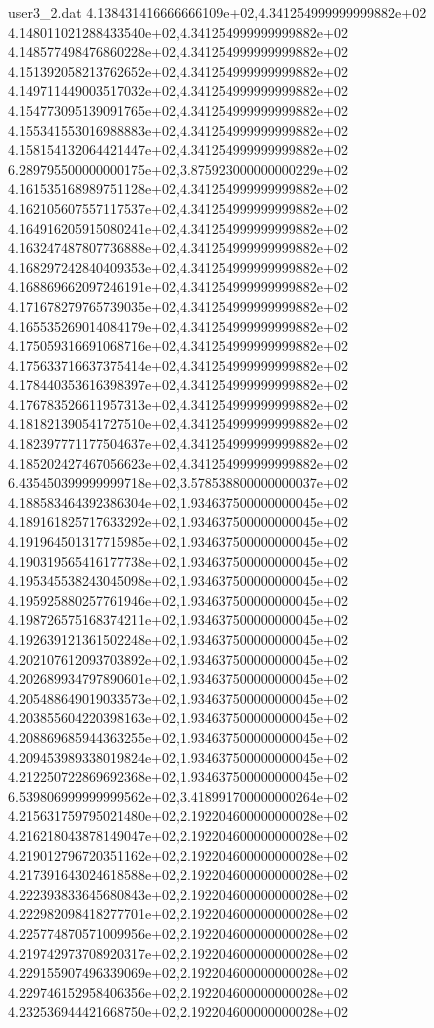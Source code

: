 \begin{filecontents}{user3_2.dat}
4.138431416666666109e+02,4.341254999999999882e+02
4.148011021288433540e+02,4.341254999999999882e+02
4.148577498476860228e+02,4.341254999999999882e+02
4.151392058213762652e+02,4.341254999999999882e+02
4.149711449003517032e+02,4.341254999999999882e+02
4.154773095139091765e+02,4.341254999999999882e+02
4.155341553016988883e+02,4.341254999999999882e+02
4.158154132064421447e+02,4.341254999999999882e+02
6.289795500000000175e+02,3.875923000000000229e+02
4.161535168989751128e+02,4.341254999999999882e+02
4.162105607557117537e+02,4.341254999999999882e+02
4.164916205915080241e+02,4.341254999999999882e+02
4.163247487807736888e+02,4.341254999999999882e+02
4.168297242840409353e+02,4.341254999999999882e+02
4.168869662097246191e+02,4.341254999999999882e+02
4.171678279765739035e+02,4.341254999999999882e+02
4.165535269014084179e+02,4.341254999999999882e+02
4.175059316691068716e+02,4.341254999999999882e+02
4.175633716637375414e+02,4.341254999999999882e+02
4.178440353616398397e+02,4.341254999999999882e+02
4.176783526611957313e+02,4.341254999999999882e+02
4.181821390541727510e+02,4.341254999999999882e+02
4.182397771177504637e+02,4.341254999999999882e+02
4.185202427467056623e+02,4.341254999999999882e+02
6.435450399999999718e+02,3.578538800000000037e+02
4.188583464392386304e+02,1.934637500000000045e+02
4.189161825717633292e+02,1.934637500000000045e+02
4.191964501317715985e+02,1.934637500000000045e+02
4.190319565416177738e+02,1.934637500000000045e+02
4.195345538243045098e+02,1.934637500000000045e+02
4.195925880257761946e+02,1.934637500000000045e+02
4.198726575168374211e+02,1.934637500000000045e+02
4.192639121361502248e+02,1.934637500000000045e+02
4.202107612093703892e+02,1.934637500000000045e+02
4.202689934797890601e+02,1.934637500000000045e+02
4.205488649019033573e+02,1.934637500000000045e+02
4.203855604220398163e+02,1.934637500000000045e+02
4.208869685944363255e+02,1.934637500000000045e+02
4.209453989338019824e+02,1.934637500000000045e+02
4.212250722869692368e+02,1.934637500000000045e+02
6.539806999999999562e+02,3.418991700000000264e+02
4.215631759795021480e+02,2.192204600000000028e+02
4.216218043878149047e+02,2.192204600000000028e+02
4.219012796720351162e+02,2.192204600000000028e+02
4.217391643024618588e+02,2.192204600000000028e+02
4.222393833645680843e+02,2.192204600000000028e+02
4.222982098418277701e+02,2.192204600000000028e+02
4.225774870571009956e+02,2.192204600000000028e+02
4.219742973708920317e+02,2.192204600000000028e+02
4.229155907496339069e+02,2.192204600000000028e+02
4.229746152958406356e+02,2.192204600000000028e+02
4.232536944421668750e+02,2.192204600000000028e+02

\end{filecontents}
